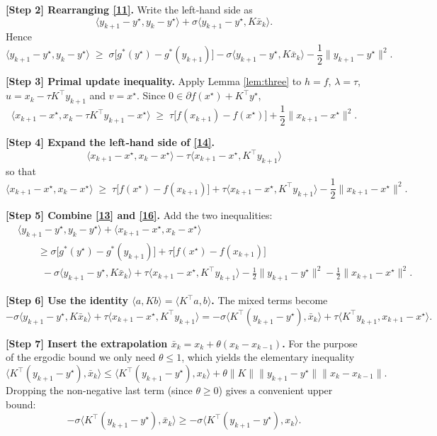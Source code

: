 \documentclass{article}
\newcommand{\inner}[2]{\langle #1,#2\rangle}
\newcommand{\norm}[1]{\|#1\|}
\begin{document}
\noindent\textbf{[Step 2] Rearranging \eqref{11}.}  
Write the left‑hand side as
\[
\inner{y_{k+1}-y^{\star}}{y_{k}-y^{\star}} 
+ \sigma\inner{y_{k+1}-y^{\star}}{K\bar x_{k}} .
\tag{12}
\]
Hence
\[
\inner{y_{k+1}-y^{\star}}{y_{k}-y^{\star}}
\;\ge\;
\sigma\bigl[g^{*}(y^{\star})-g^{*}(y_{k+1})\bigr]
-\sigma\inner{y_{k+1}-y^{\star}}{K\bar x_{k}}
-\frac{1}{2}\norm{y_{k+1}-y^{\star}}^{2}.
\tag{13}
\]

\noindent\textbf{[Step 3] Primal update inequality.}  
Apply Lemma \ref{lem:three} to $h=f$, $\lambda=\tau$, $u=x_{k}-\tau K^{\!\top}y_{k+1}$ and $v=x^{\star}$.
Since $0\in\partial f(x^{\star})+K^{\!\top}y^{\star}$,
\[
\inner{x_{k+1}-x^{\star}}{x_{k}-\tau K^{\!\top}y_{k+1}-x^{\star}}
\;\ge\;
\tau\bigl[f(x_{k+1})-f(x^{\star})\bigr]
+\frac{1}{2}\norm{x_{k+1}-x^{\star}}^{2}.
\tag{14}
\]

\noindent\textbf{[Step 4] Expand the left‑hand side of \eqref{14}.}
\[
\inner{x_{k+1}-x^{\star}}{x_{k}-x^{\star}}
-\tau\inner{x_{k+1}-x^{\star}}{K^{\!\top}y_{k+1}}
\tag{15}
\]
so that
\[
\inner{x_{k+1}-x^{\star}}{x_{k}-x^{\star}}
\;\ge\;
\tau\bigl[f(x^{\star})-f(x_{k+1})\bigr]
+\tau\inner{x_{k+1}-x^{\star}}{K^{\!\top}y_{k+1}}
-\frac{1}{2}\norm{x_{k+1}-x^{\star}}^{2}.
\tag{16}
\]

\noindent\textbf{[Step 5] Combine \eqref{13} and \eqref{16}.}  
Add the two inequalities:
\[
\begin{aligned}
&\inner{y_{k+1}-y^{\star}}{y_{k}-y^{\star}}
 +\inner{x_{k+1}-x^{\star}}{x_{k}-x^{\star}}  \\
&\qquad \ge
 \sigma\bigl[g^{*}(y^{\star})-g^{*}(y_{k+1})\bigr]
 +\tau\bigl[f(x^{\star})-f(x_{k+1})\bigr]   \\
&\qquad\ \ -\sigma\inner{y_{k+1}-y^{\star}}{K\bar x_{k}}
        +\tau\inner{x_{k+1}-x^{\star}}{K^{\!\top}y_{k+1}}
 -\frac{1}{2}\norm{y_{k+1}-y^{\star}}^{2}
 -\frac{1}{2}\norm{x_{k+1}-x^{\star}}^{2}.
\end{aligned}
\tag{17}
\]

\noindent\textbf{[Step 6] Use the identity
$\inner{a}{Kb}= \inner{K^{\!\top}a}{b}$.}
The mixed terms become
\[
-\sigma\inner{y_{k+1}-y^{\star}}{K\bar x_{k}}
   +\tau\inner{x_{k+1}-x^{\star}}{K^{\!\top}y_{k+1}}
= -\sigma\inner{K^{\!\top}(y_{k+1}-y^{\star})}{\bar x_{k}}
   +\tau\inner{K^{\!\top}y_{k+1}}{x_{k+1}-x^{\star}}.
\tag{18}
\]

\noindent\textbf{[Step 7] Insert the extrapolation $\bar x_{k}=x_{k}+ \theta (x_{k}-x_{k-1})$.}  
For the purpose of the ergodic bound we only need $\theta\le1$, which yields the elementary inequality
\[
\inner{K^{\!\top}(y_{k+1}-y^{\star})}{\bar x_{k}}
\le
\inner{K^{\!\top}(y_{k+1}-y^{\star})}{x_{k}}
+ \theta\|K\|\norm{y_{k+1}-y^{\star}}\norm{x_{k}-x_{k-1}}.
\tag{19}
\]
Dropping the non‑negative last term (since $\theta\ge0$) gives a convenient upper bound:
\[
-\sigma\inner{K^{\!\top}(y_{k+1}-y^{\star})}{\bar x_{k}}
\ge
-\sigma\inner{K^{\!\top}(y_{k+1}-y^{\star})}{x_{k}} .
\tag{20}
\]
\end{document}
